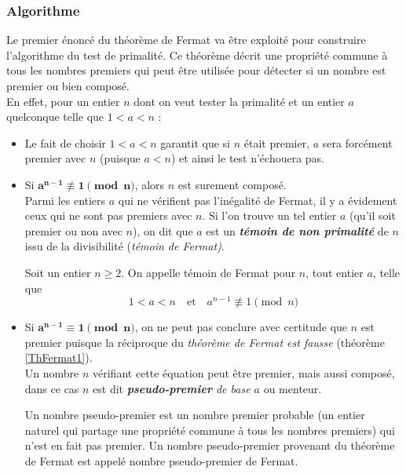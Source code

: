 	\subsubsection{Algorithme}
		Le premier énoncé du théorème de Fermat va être exploité pour construire l'algorithme du test de primalité. Ce théorème décrit une propriété commune à tous les nombres premiers qui peut être utilisée pour détecter si un nombre est premier ou bien composé.\\
		En effet, pour un entier $n$ dont on veut tester la primalité et un entier $a$ quelconque telle que $1 < a < n$ : 
		\begin{itemize}
			\item Le fait de choisir $1 < a < n$ garantit que si $n$ était premier, $a$ sera forcément premier avec $n$ (puisque $a < n$) et ainsi le test n'échouera pas. 
			\item Si $\mathbf{a^{n-1} \not\equiv 1 \pmod n}$, alors $n$ est surement composé.\\
			Parmi les entiers $a$ qui ne vérifient pas l'inégalité de Fermat, il y a évidement ceux qui ne sont pas premiers avec $n$. Si l'on trouve un tel entier $a$ (qu'il soit premier ou non avec $n$), on dit que $a$ est un \textit{\textbf{témoin de non primalité}} de $n$ issu de la divisibilité (\textit{témoin de Fermat)}.
					
					\vspace{-1.5em}\begin{adjustwidth}{1.5cm}{1.5cm} 
					\begin{Def}
						\label{TemFermat}
						Soit un entier $n \geqslant 2$. On appelle témoin de Fermat pour $n$, tout entier $a$, telle que
						\[1 < a < n  \quad \text{et} \quad a^{n-1} \not\equiv 1 \pmod n\]
					\end{Def}
					\end{adjustwidth}\vspace{0.5em}
					
			\item Si $\mathbf{a^{n-1}\equiv 1 \pmod n}$, on ne peut pas conclure avec certitude que $n$ est premier puisque la réciproque du \textit{théorème de Fermat est fausse} (théorème \ref{ThFermat1}).\\
				Un nombre $n$ vérifiant cette équation peut être premier, mais aussi composé, dans ce cas $n$ est dit \textit{\textbf{pseudo-premier} de base $a$} ou menteur.
					
					\vspace{-1.5em}\begin{adjustwidth}{1.5cm}{1.5cm} 
					\begin{Def}
						\label{PseudoPrem}
						Un nombre pseudo-premier est un nombre premier probable (un entier naturel qui partage une propriété commune à tous les nombres premiers) qui n'est en fait pas premier. Un nombre pseudo-premier provenant du théorème de Fermat est appelé nombre pseudo-premier de Fermat.
					\end{Def}
					\end{adjustwidth}\vspace{0.5em}
					

\end{itemize}

